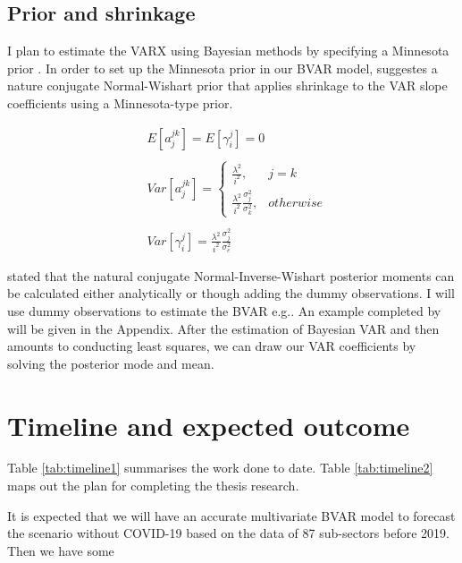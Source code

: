 \documentclass[11pt,a4paper,]{article}
\begin{document}
\hypertarget{prior-and-shrinkage}{%
\subsection{Prior and shrinkage}\label{prior-and-shrinkage}}

I plan to estimate the VARX using Bayesian methods by specifying a Minnesota prior \autocites[e.g.][]{anderson2020,litterman1986,robertson1999vector}. In order to set up the Minnesota prior in our BVAR model, \textcite{banbura2010large} suggestes a nature conjugate Normal-Wishart prior that applies shrinkage to the VAR slope coefficients using a Minnesota-type prior.

\[
\begin{aligned}
&E[a_{j}^{jk}] = E[\gamma_{i}^j]=0\\
\\
&Var[a_j^{jk}]= 
\begin{cases}
\frac{\lambda^2}{i^2},&j=k\\
\frac{\lambda^2}{i^2}\frac{\sigma^2_{j}}{\sigma^2_k},& otherwise
\end{cases}\\
\\
&Var[\gamma_i^{j}]=\frac{\lambda^2}{i^2}\frac{\sigma^2_{j}}{\sigma^2_e}
\end{aligned}
\]

\textcite{banbura2010large} stated that the natural conjugate Normal-Inverse-Wishart posterior moments can be calculated either analytically or though adding the dummy observations. I will use dummy observations to estimate the BVAR e.g.\autocite{banbura2010large,anderson2020,wozniak2016bayesian}. An example completed by \textcite{anderson2020} will be given in the Appendix. After the estimation of Bayesian VAR and then amounts to conducting least squares, we can draw our VAR coefficients by solving the posterior mode and mean.

\hypertarget{timeline-and-expected-outcome}{%
\section{Timeline and expected outcome}\label{timeline-and-expected-outcome}}

Table \ref{tab:timeline1} summarises the work done to date. Table \ref{tab:timeline2} maps out the plan for completing the thesis research.

It is expected that we will have an accurate multivariate BVAR model to forecast the scenario without COVID-19 based on the data of 87 sub-sectors before 2019. Then we have some
\end{document}
